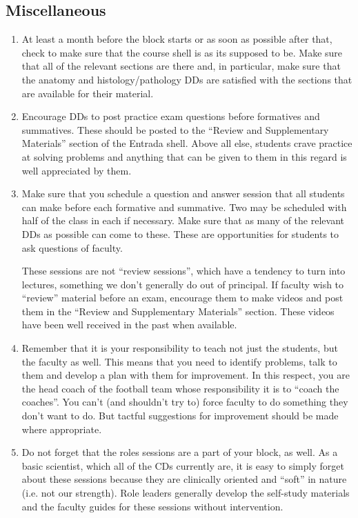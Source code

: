 \documentclass[11pt]{article}
\begin{document}
\subsection*{Miscellaneous}
\begin{enumerate}
\item At least a month before the block starts or as soon as possible after that, check to make sure that the course shell is as its supposed to be.  Make sure that all of the relevant sections are there and, in particular, make sure that the anatomy and histology/pathology DDs are satisfied with the sections that are available for their material.
\item Encourage DDs to post practice exam questions before formatives and summatives.  These should be posted to the ``Review and Supplementary Materials'' section of the Entrada shell.  Above all else, students crave practice at solving problems and anything that can be given to them in this regard is well appreciated by them.
\item Make sure that you schedule a question and answer session that all students can make before each formative and summative.  Two may be scheduled with half of the class in each if necessary.  Make sure that as many of the relevant DDs as possible can come to these.  These are opportunities for students to ask questions of faculty.

  These sessions are not ``review sessions'', which have a tendency to turn into lectures, something we don't generally do out of principal.  If faculty wish to ``review'' material before an exam, encourage them to make videos and post them in the ``Review and Supplementary Materials'' section.  These videos have been well received in the past when available.

\item Remember that it is your responsibility to teach not just the students, but the faculty as well.  This means that you need to identify problems, talk to them and develop a plan with them for improvement.  In this respect, you are the head coach of the football team whose responsibility it is to ``coach the coaches''.  You can't (and shouldn't try to) force faculty to do something they don't want to do.  But tactful suggestions for improvement should be made where appropriate.

\item Do not forget that the roles sessions are a part of your block, as well.  As a basic scientist, which all of the CDs currently are, it is easy to simply forget about these sessions because they are clinically oriented and ``soft'' in nature (i.e. not our strength).  Role leaders generally develop the self-study materials and the faculty guides for these sessions without intervention.


\end{enumerate}
\end{document}
